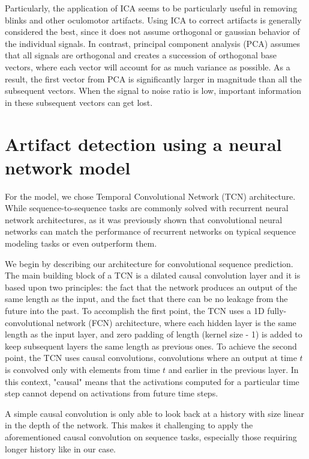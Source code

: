 \documentclass[12pt,a4paper,titlepage,openany]{report}
\begin{document}
Particularly, the application of ICA seems to be particularly useful in removing blinks and other oculomotor artifacts. Using ICA to correct artifacts is generally considered the best, since it does not assume orthogonal or gaussian behavior of the individual signals. 
In contrast, principal component analysis (PCA) assumes that all signals are orthogonal and creates a succession of orthogonal base vectors, where each vector will account for as much variance as possible. 
As a result, the ﬁrst vector from PCA is signiﬁcantly larger in magnitude than all the subsequent vectors. 
When the signal to noise ratio is low, important information in these subsequent vectors can get lost\cite{makkar2023}.

\section{Artifact detection using a neural network model}

For the model, we chose Temporal Convolutional Network (TCN) architecture. While sequence-to-sequence tasks are commonly solved with recurrent neural network architectures, as it was previously shown that convolutional neural networks can match the performance of recurrent networks on typical sequence modeling tasks or even outperform them.

We begin by describing our architecture for convolutional sequence prediction. The main building block of a TCN is a dilated causal convolution layer and it is based upon two principles: the fact that the network produces an output of the same length as the input, and the fact that there can be no leakage from the future into the past. To accomplish the first point, the TCN uses a 1D fully-convolutional network (FCN) architecture, where each hidden layer is the same length as the input layer, and zero padding of length (kernel size - 1) is added to keep subsequent layers the same length as previous ones. To achieve the second point, the TCN uses causal convolutions, convolutions where an output at time \(t\) is convolved only with elements from time \(t\) and earlier in the previous layer. In this context, "causal" means that the activations computed for a particular time step cannot depend on activations from future time steps.

A simple causal convolution is only able to look back at a history with size linear in the depth of the network. This makes it challenging to apply the aforementioned causal convolution on sequence tasks, especially those requiring longer history like in our case.
\end{document}
